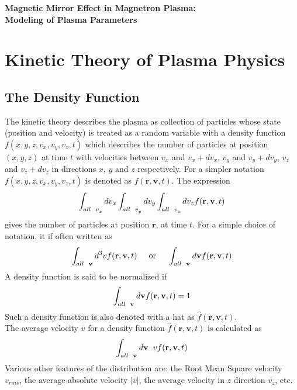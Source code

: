 \documentclass[12pt]{article}
\begin{document}
	{\selectfont 
		\begin{center}
			\Large{\textbf{Magnetic Mirror Effect in Magnetron Plasma:}} \\
			\Large{\textbf{Modeling of Plasma Parameters}} \\
		\end{center}

\section{Kinetic Theory of Plasma Physics}
\subsection{The Density Function}
	The kinetic theory describes the plasma as collection of particles whose state (position and velocity) is treated as a random variable with a density function $ f(x, y, z, v_{x}, v_{y}, v_{z}, t) $ which describes the number of particles at position $ (x, y, z) $ at time $ t $ with velocities between $ v_{x} $ and $ v_{x} + dv_{x} $, $ v_{y} $ and $ v_{y} + dv_{y} $, $ v_{z} $ and $ v_{z} + dv_{z} $ in directions $x$, $y$ and $z$ respectively. For a simpler notation $ f(x, y, z, v_{x}, v_{y}, v_{z}, t) $ is denoted as $ f(\textbf{r}, \textbf{v}, t) $.
	The expression $$\displaystyle \int_{all \hspace{0.2cm} v_{x}^{}} dv_{x} \int_{all \hspace{0.2cm} v_{y}^{}} dv_{y} \int_{all \hspace{0.2cm} v_{z}^{}} dv_{z} f(\textbf{r}, \textbf{v}, t) $$ gives the number of particles at position $\textbf{r}$, at time $t$.  For a simple choice of notation, it if often written as $$\displaystyle \int_{all \hspace{0.2cm} \textbf{v}^{}} d^{3}v f(\textbf{r}, \textbf{v}, t) \hspace{0.5cm}\textrm{or} \hspace{0.5cm}\int_{all \hspace{0.2cm} \textbf{v}^{}} d\textbf{v} f(\textbf{r}, \textbf{v}, t)$$ A density function is said to be normalized if $$\displaystyle \int_{all \hspace{0.2cm} \textbf{v}^{}} d\textbf{v} f(\textbf{r}, \textbf{v}, t) = 1$$ Such a density function is also denoted with a hat as $ \hat{f}(\textbf{r}, \textbf{v}, t) $.\\
	\noindent The average velocity $\bar{v}$ for a density function $ \hat{f}(\textbf{r}, \textbf{v}, t) $ is calculated as  $$\displaystyle \int_{all \hspace{0.2cm} \textbf{v}^{}} d\textbf{v} \hspace{0.2cm} v f(\textbf{r}, \textbf{v}, t)$$ Various other features of the distribution are: the Root Mean Square velocity $v_{rms}$, the average absolute velocity $|\bar{v}|$, the average velocity in $z$ direction $\bar{v_{z}}$, etc.\\
	
}
\end{document}
